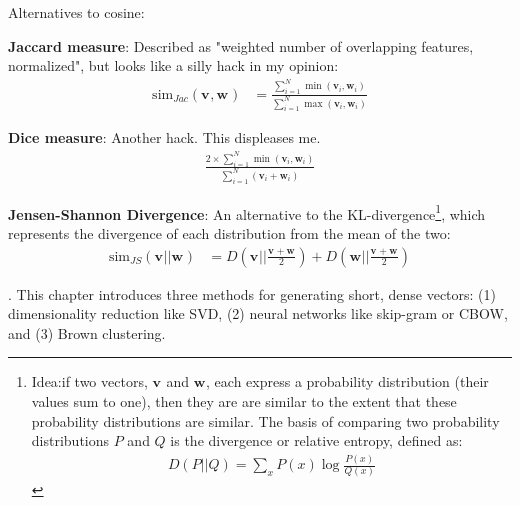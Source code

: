 \documentclass[11pt]{article}
\renewcommand\vec[2][]{\bm{#2}_{#1}}
\newcommand\p{\Needspace{10\baselineskip} \noindent}
\begin{document}
\p Alternatives to cosine:
\begin{compactitem}
	\item \textbf{Jaccard measure}: Described as "weighted number of overlapping features, normalized", but looks like a silly hack in my opinion:
	\begin{align}
		\text{sim}_{Jac}(\vec{v}, \vec{w}) &= \frac{ \sum_{i=1}^{N} \min(\vec[i]{v}, \vec[i]{w}) }{
			\sum_{i=1}^{N} \max(\vec[i]{v}, \vec[i]{w})
		}
	\end{align}
	
	\item \textbf{Dice measure}: Another hack. This displeases me.
	\begin{align}
		\frac{ 2 \times  \sum_{i=1}^{N} \min(\vec[i]{v}, \vec[i]{w}) }{  \sum_{i=1}^{N}( \vec[i]{v} +  \vec[i]{w})  }
	\end{align}
	
	\item \textbf{Jensen-Shannon Divergence}: An alternative to the KL-divergence\footnote{
		Idea:if two vectors, $\vec{v}$ and $\vec{w}$, each express a probability
		distribution (their values sum to one), then they are are similar to the extent that these
		probability distributions are similar. The basis of comparing two probability distributions $P$ and $Q$ is the  divergence or relative
		entropy, defined as:
		\begin{align}
		D(P || Q) = \sum_x P(x) \log \frac{P(x)}{Q(x)}
		\end{align}
		
		}, which represents the divergence of each distribution from the mean of the two:
		\begin{align}
		\text{sim}_{JS}(\vec{v} || \vec{w}) &= D\left( \vec{v} \bigg|\bigg| \frac{ \vec{v} + \vec{w} }{2} \right)  + D\left( \vec{w} \bigg|\bigg| \frac{ \vec{v} + \vec{w} }{2} \right)
		\end{align}
\end{compactitem}






\p {}. This chapter introduces three methods for generating short, dense vectors: (1) dimensionality reduction like SVD, (2) neural networks like skip-gram or CBOW, and (3) Brown clustering.
\end{document}

